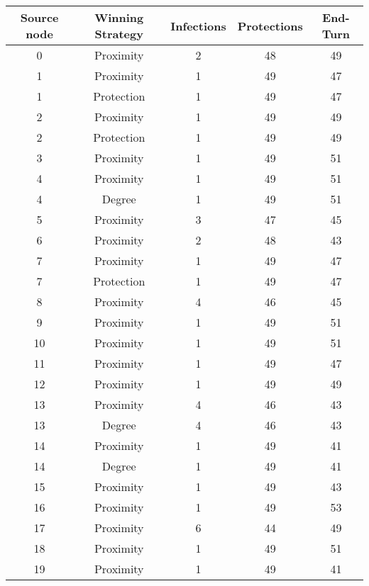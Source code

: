 \documentclass[results.tex]{subfiles}
\begin{document}
\begin{center}
  \begin{tabular}{| c || c | c | c | c |}
    \hline
    {\bfseries Source node} & {\bfseries Winning Strategy} & {\bfseries Infections} & {\bfseries Protections} & {\bfseries End-Turn} \\  %
    \hline\hline
    0 & Proximity & 2 & 48 & 49 \\ 
    \hline
    1 & Proximity & 1 & 49 & 47 \\ 
    \hline
    1 & Protection & 1 & 49 & 47 \\ 
    \hline
    2 & Proximity & 1 & 49 & 49 \\ 
    \hline
    2 & Protection & 1 & 49 & 49 \\ 
    \hline
    3 & Proximity & 1 & 49 & 51 \\ 
    \hline
    4 & Proximity & 1 & 49 & 51 \\ 
    \hline
    4 & Degree & 1 & 49 & 51 \\ 
    \hline
    5 & Proximity & 3 & 47 & 45 \\ 
    \hline
    6 & Proximity & 2 & 48 & 43 \\ 
    \hline
    7 & Proximity & 1 & 49 & 47 \\ 
    \hline
    7 & Protection & 1 & 49 & 47 \\ 
    \hline
    8 & Proximity & 4 & 46 & 45 \\ 
    \hline
    9 & Proximity & 1 & 49 & 51 \\ 
    \hline
    10 & Proximity & 1 & 49 & 51 \\ 
    \hline
    11 & Proximity & 1 & 49 & 47 \\ 
    \hline
    12 & Proximity & 1 & 49 & 49 \\ 
    \hline
    13 & Proximity & 4 & 46 & 43 \\ 
    \hline
    13 & Degree & 4 & 46 & 43 \\ 
    \hline
    14 & Proximity & 1 & 49 & 41 \\ 
    \hline
    14 & Degree & 1 & 49 & 41 \\ 
    \hline
    15 & Proximity & 1 & 49 & 43 \\ 
    \hline
    16 & Proximity & 1 & 49 & 53 \\ 
    \hline
    17 & Proximity & 6 & 44 & 49 \\ 
    \hline
    18 & Proximity & 1 & 49 & 51 \\ 
    \hline
    19 & Proximity & 1 & 49 & 41 \\ 

\end{tabular}
\end{center}
\end{document}
